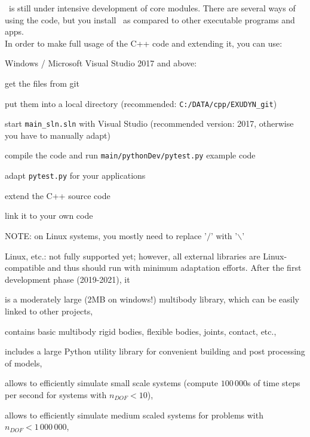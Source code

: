 \codeName\ is still under intensive development of core modules.
There are several ways of using the code, but you  install \codeName\ as compared to other executable programs and apps.
\vspace{6pt}\\
In order to make full usage of the C++ code and extending it, you can use:
\bi
  \item Windows / Microsoft Visual Studio 2017 and above:
  \bi
    \item get the files from git
    \item put them into a local directory (recommended: \texttt{C:/DATA/cpp/EXUDYN\_git})
    \item start \texttt{main\_sln.sln} with Visual Studio (recommended version: 2017, otherwise you have to manually adapt)
    \item compile the code and run \texttt{main/pythonDev/pytest.py} example code
    \item adapt \texttt{pytest.py} for your applications
    \item extend the C++ source code
    \item link it to your own code
    \item NOTE: on Linux systems, you mostly need to replace '$/$' with '$\backslash$'
  \ei
  \item Linux, etc.: not fully supported yet; however, all external libraries are Linux-compatible and thus should run with minimum adaptation efforts.
\ei
%
After the first development phase (2019-2021), it
\bi
  \item is a moderately large (2MB on windows!) multibody library, which can be easily linked to other projects,
  \item contains basic multibody rigid bodies, flexible bodies, joints, contact, etc.,
  \item includes a large Python utility library for convenient building and post processing of models,
  \item allows to efficiently simulate small scale systems (compute $100\,000$s of time steps per second for systems with $n_{DOF}<10$),
  \item allows to efficiently simulate medium scaled systems for problems with $n_{DOF} < 1\,000\,000$,
